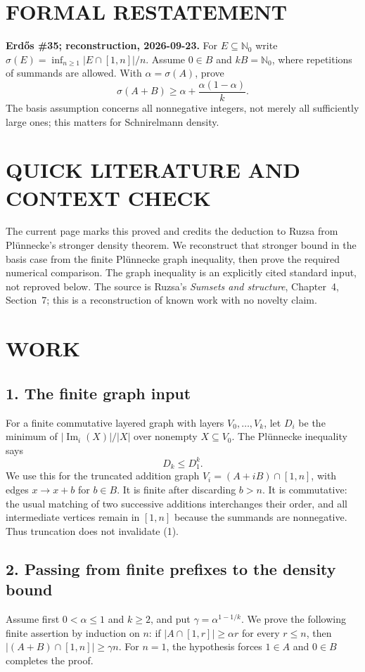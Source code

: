 \section{FORMAL RESTATEMENT}
\textbf{Erd\H{o}s \#35; reconstruction, 2026-09-23.}
For $E\subseteq\mathbb N_0$ write
$\sigma(E)=\inf_{n\geq1}|E\cap[1,n]|/n$.
Assume $0\in B$ and $kB=\mathbb N_0$, where repetitions of summands
are allowed. With $\alpha=\sigma(A)$, prove
\[
 \sigma(A+B)\geq\alpha+\frac{\alpha(1-\alpha)}k.
\]
The basis assumption concerns all nonnegative integers, not merely
all sufficiently large ones; this matters for Schnirelmann density.

\section{QUICK LITERATURE AND CONTEXT CHECK}
The current page marks this proved and credits the deduction to Ruzsa
from Pl\"unnecke's stronger density theorem. We reconstruct that stronger
bound in the basis case from the finite Pl\"unnecke graph inequality,
then prove the required numerical comparison. The graph inequality is
an explicitly cited standard input, not reproved below. The source is
Ruzsa's \emph{Sumsets and structure}, Chapter~4, Section~7; this is a
reconstruction of known work with no novelty claim.

\section{WORK}
\subsection{1. The finite graph input}
For a finite commutative layered graph with layers $V_0,\ldots,V_k$,
let $D_i$ be the minimum of $|\operatorname{Im}_i(X)|/|X|$ over nonempty
$X\subseteq V_0$. The Pl\"unnecke inequality says
\[
 D_k\leq D_1^k.                                      \tag{1}
\]
We use this for the truncated addition graph
$V_i=(A+iB)\cap[1,n]$, with edges $x\to x+b$ for $b\in B$.
It is finite after discarding $b>n$. It is commutative: the usual
matching of two successive additions interchanges their order, and
all intermediate vertices remain in $[1,n]$ because the summands
are nonnegative. Thus truncation does not invalidate (1).

\subsection{2. Passing from finite prefixes to the density bound}
Assume first $0<\alpha\leq1$ and $k\geq2$, and put
$\gamma=\alpha^{1-1/k}$. We prove the following finite assertion by
induction on $n$: if $|A\cap[1,r]|\geq\alpha r$ for every $r\leq n$,
then $|(A+B)\cap[1,n]|\geq\gamma n$.
For $n=1$, the hypothesis forces $1\in A$ and $0\in B$ completes the
proof.


